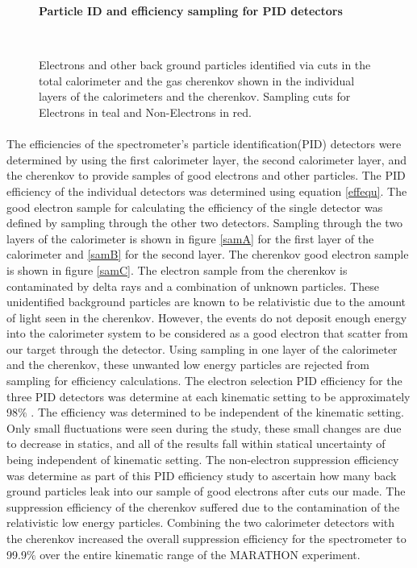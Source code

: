 \begin{figure}[t]%
	{\centering
		\textbf{Particle ID and efficiency sampling for PID detectors }\par\medskip}
	\centering
	\\
	\caption{Electrons and other back ground particles identified via cuts in the total calorimeter and the gas cherenkov shown in the individual layers of the calorimeters and the cherenkov. Sampling cuts for Electrons in teal and Non-Electrons in red.}%
	\label{sampling}%
\end{figure}


\paragraph{}The efficiencies of the spectrometer's particle identification(PID) detectors were determined by using the first calorimeter layer, the second calorimeter layer, and the cherenkov to provide samples of good electrons and other particles. The PID efficiency of the individual detectors was determined using equation \ref{effequ}. The good electron sample for calculating the efficiency of the single detector was defined by sampling through the other two detectors. Sampling through the two layers of the calorimeter is shown in figure \ref{samA} for the first layer of the calorimeter and \ref{samB} for the second layer. The cherenkov good electron sample is shown in figure \ref{samC}. The electron sample from the cherenkov is contaminated by delta rays and a combination of unknown particles. These unidentified background particles are known to be relativistic due to the amount of light seen in the cherenkov. However, the events do not deposit enough energy into the calorimeter system to be considered as a good electron that scatter from our target through the detector. Using sampling in one layer of the calorimeter and the cherenkov, these unwanted low energy particles are rejected from sampling for efficiency calculations. The electron selection PID efficiency for the three PID detectors was determine at each kinematic setting to be approximately 98$\%$ . The efficiency was determined to be independent of the kinematic setting. Only small fluctuations were seen during the study, these small changes are due to decrease in statics, and all of the results fall within statical uncertainty of being independent of kinematic setting. The non-electron suppression efficiency was determine as part of this PID efficiency study to ascertain how many back ground particles leak into our sample of good electrons after cuts our made. The suppression efficiency of the cherenkov suffered due to the contamination of the relativistic low energy particles. Combining the two calorimeter detectors with the cherenkov increased the overall suppression efficiency for the spectrometer to 99.9$\%$ over the entire kinematic range of the MARATHON experiment. 

